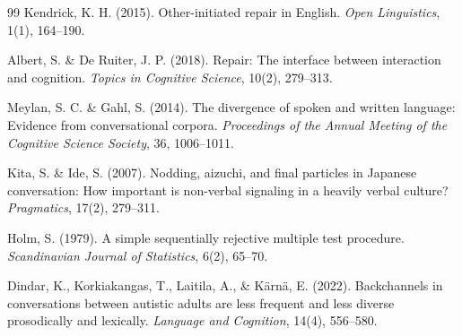 \documentclass[dvipdfmx,11pt,a4paper]{bxjsarticle}
\begin{document}
\begin{thebibliography}{99}
Kendrick, K. H. (2015).
Other-initiated repair in English.
\textit{Open Linguistics}, 1(1), 164--190.

Albert, S. \& De Ruiter, J. P. (2018).
Repair: The interface between interaction and cognition.
\textit{Topics in Cognitive Science}, 10(2), 279--313.

Meylan, S. C. \& Gahl, S. (2014).
The divergence of spoken and written language: Evidence from conversational corpora.
\textit{Proceedings of the Annual Meeting of the Cognitive Science Society}, 36, 1006--1011.

Kita, S. \& Ide, S. (2007).
Nodding, aizuchi, and final particles in Japanese conversation: How important is non-verbal signaling in a heavily verbal culture?
\textit{Pragmatics}, 17(2), 279--311.

Holm, S. (1979).
A simple sequentially rejective multiple test procedure.
\textit{Scandinavian Journal of Statistics}, 6(2), 65--70.

Dindar, K., Korkiakangas, T., Laitila, A., \& Kärnä, E. (2022).
Backchannels in conversations between autistic adults are less frequent and less diverse prosodically and lexically.
\textit{Language and Cognition}, 14(4), 556--580.

\end{thebibliography}
\end{document}
